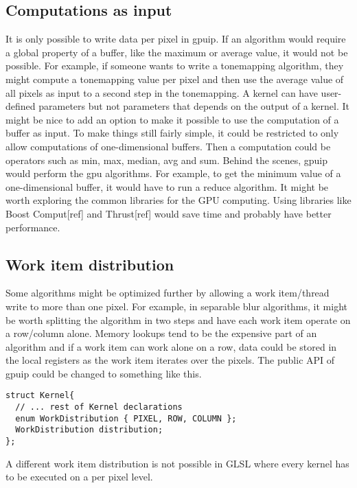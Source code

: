 \subsection{Computations as input}

It is only possible to write data per pixel in gpuip. If an algorithm would require a global property of a buffer, like the maximum or average value, it would not be possible. For example, if someone wants to write a tonemapping algorithm, they might compute a tonemapping value per pixel and then use the average value of all pixels as input to a second step in the tonemapping. A kernel can have user-defined parameters but not parameters that depends on the output of a kernel. It might be nice to add an option to make it possible to use the computation of a buffer as input. To make things still fairly simple, it could be restricted to only allow computations of one-dimensional buffers. Then a computation could be operators such as min, max, median, avg and sum. Behind the scenes, gpuip would perform the gpu algorithms. For example, to get the minimum value of a one-dimensional buffer, it would have to run a reduce algorithm. It might be worth exploring the common libraries for the GPU computing. Using libraries like Boost Comput[ref] and Thrust[ref] would save time and probably have better performance.

\subsection{Work item distribution}

Some algorithms might be optimized further by allowing a work item/thread write to more than one pixel. For example, in separable blur algorithms, it might be worth splitting the algorithm in two steps and have each work item operate on a row/column alone. Memory lookups tend to be the expensive part of an algorithm and if a work item can work alone on a row, data could be stored in the local registers as the work item iterates over the pixels. The public API of gpuip could be changed to something like this.
\newline
\renewcommand{\lstlistingname}{Code}
\begin{lstlisting}[caption= gpuip kernel work item distribution, label=dist]
struct Kernel{
  // ... rest of Kernel declarations 
  enum WorkDistribution { PIXEL, ROW, COLUMN };
  WorkDistribution distribution;
};
\end{lstlisting}
A different work item distribution is not possible in GLSL where every kernel has to be executed on a per pixel level.
